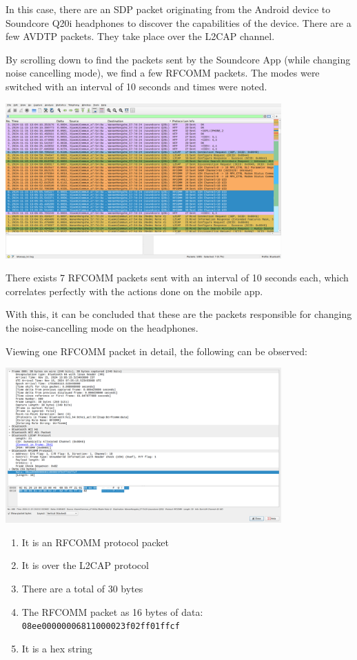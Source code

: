 \documentclass{article}
\theoremstyle{mytheoremstyle}
\theoremstyle{mytheoremstyle}
\theoremstyle{myproblemstyle}
\begin{document}
In this case, there are an SDP packet originating from the Android device to Soundcore Q20i headphones to discover the capabilities of the device.
There are a few AVDTP packets. They take place over the L2CAP channel.

\newpage

By scrolling down to find the packets sent by the Soundcore App (while changing noise cancelling mode),
we find a few RFCOMM packets. The modes were switched with an interval of 10 seconds and times were noted.
\begin{center}
  \includegraphics[width=400px]{wireshark-rfcomm}
\end{center}

There exists 7 RFCOMM packets sent with an interval of 10 seconds each, which correlates perfectly with the actions done on the mobile app.

With this, it can be concluded that these are the packets responsible for changing the noise-cancelling mode on the headphones.

\newpage

Viewing one RFCOMM packet in detail, the following can be observed:
\begin{center}
  \includegraphics[width=400px]{wireshark-detailed-packet}
\end{center}

\begin{enumerate}
  \item It is an RFCOMM protocol packet 
  \item It is over the L2CAP protocol 
  \item There are a total of 30 bytes 
  \item The RFCOMM packet as 16 bytes of data: \texttt{08ee00000006811000023f02ff01ffcf}
  \item It is a hex string
\end{enumerate}
\end{document}
